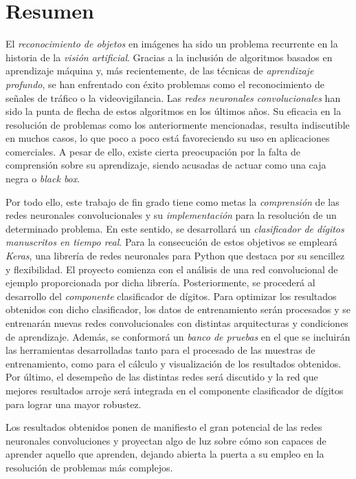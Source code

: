 \chapter*{Resumen}
El \emph{reconocimiento de objetos} en imágenes ha sido un problema recurrente en la historia de la \emph{visión artificial}. Gracias a la inclusión de algoritmos basados en aprendizaje máquina y, más recientemente, de las técnicas de \emph{aprendizaje profundo}, se han enfrentado con éxito problemas como el reconocimiento de señales de tráfico o la videovigilancia. Las \emph{redes neuronales convolucionales} han sido la punta de flecha de estos algoritmos en los últimos años. Su eficacia en la resolución de problemas como los anteriormente mencionadas, resulta indiscutible en muchos casos, lo que poco a poco está favoreciendo su uso en aplicaciones comerciales. A pesar de ello, existe cierta preocupación por la falta de comprensión sobre su aprendizaje, siendo acusadas de actuar como una caja negra o \emph{black box}.

Por todo ello, este trabajo de fin grado tiene como metas la \emph{comprensión} de las redes neuronales convolucionales y su \emph{implementación} para la resolución de un determinado problema. En este sentido, se desarrollará un \emph{clasificador de dígitos manuscritos en tiempo real}. Para la consecución de estos objetivos se empleará \emph{Keras}, una librería de redes neuronales para Python que destaca por su sencillez y flexibilidad. El proyecto comienza con el análisis de una red convolucional de ejemplo proporcionada por dicha librería. Posteriormente, se procederá al desarrollo del \emph{componente} clasificador de dígitos. Para optimizar los resultados obtenidos con dicho clasificador, los datos de entrenamiento serán procesados y se entrenarán nuevas redes convolucionales con distintas arquitecturas y condiciones de aprendizaje. Además, se conformorá un \emph{banco de pruebas} en el que se incluirán las herramientas desarrolladas tanto para el procesado de las muestras de entrenamiento, como para el cálculo y visualización de los resultados obtenidos. Por último, el desempeño de las distintas redes será discutido y la red que mejores resultados arroje será integrada en el componente clasificador de dígitos para lograr una mayor robustez.

Los resultados obtenidos ponen de manifiesto el gran potencial de las redes neuronales convoluciones y proyectan algo de luz sobre cómo son capaces de aprender aquello que aprenden, dejando abierta la puerta a su empleo en la resolución de problemas más complejos.